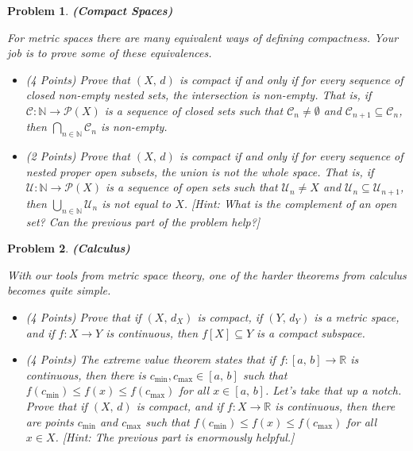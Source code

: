\documentclass{article}
\theoremstyle{normal}
\newtheorem{problem}{Problem}
\begin{document}
    \begin{problem}
        \textbf{(Compact Spaces)}
        \par\hfill\par
        For metric spaces there are many equivalent ways of defining
        compactness. Your job is to prove some of these equivalences.
        \begin{itemize}
            \item (4 Points) Prove that $(X,\,d)$ is compact if and only if
                for every sequence of closed non-empty nested sets, the
                intersection is non-empty. That is, if
                $\mathcal{C}:\mathbb{N}\rightarrow\mathcal{P}(X)$ is a sequence
                of closed sets such that $\mathcal{C}_{n}\ne\emptyset$ and
                $\mathcal{C}_{n+1}\subseteq\mathcal{C}_{n}$, then
                $\bigcap_{n\in\mathbb{N}}\mathcal{C}_{n}$ is non-empty.
            \item (2 Points) Prove that $(X,\,d)$ is compact if and only if for
                every sequence of nested proper open subsets, the union is not
                the whole space. That is, if
                $\mathcal{U}:\mathbb{N}\rightarrow\mathcal{P}(X)$ is a sequence
                of open sets such that $\mathcal{U}_{n}\ne{X}$ and
                $\mathcal{U}_{n}\subseteq\mathcal{U}_{n+1}$, then
                $\bigcup_{n\in\mathbb{N}}\mathcal{U}_{n}$ is not equal to $X$.
                [Hint: What is the complement of an open set? Can the previous
                part of the problem help?]
        \end{itemize}
    \end{problem}
    \begin{problem}
        \textbf{(Calculus)}
        \par\hfill\par
        With our tools from metric space theory, one of the harder theorems
        from calculus becomes quite simple.
        \begin{itemize}
            \item (4 Points) Prove that if $(X,\,d_{X})$ is compact, if
                $(Y,\,d_{Y})$ is a metric space, and if $f:X\rightarrow{Y}$ is
                continuous, then $f[X]\subseteq{Y}$ is a compact subspace.
            \item (4 Points) The extreme value theorem states that if
                $f:[a,\,b]\rightarrow\mathbb{R}$ is continuous, then there is
                $c_{\textrm{min}},c_{\textrm{max}}\in[a,\,b]$ such that
                $f(c_{\textrm{min}})\leq{f}(x)\leq{f}(c_{\textrm{max}})$ for
                all $x\in[a,\,b]$. Let's take that up a notch. Prove that if
                $(X,\,d)$ is compact, and if $f:X\rightarrow\mathbb{R}$ is
                continuous, then there are points $c_{\textrm{min}}$ and
                $c_{\textrm{max}}$ such that
                $f(c_{\textrm{min}})\leq{f}(x)\leq{f}(c_{\textrm{max}})$ for
                all $x\in{X}$. [Hint: The previous part is enormously helpful.]
        \end{itemize}
    \end{problem}
\end{document}
